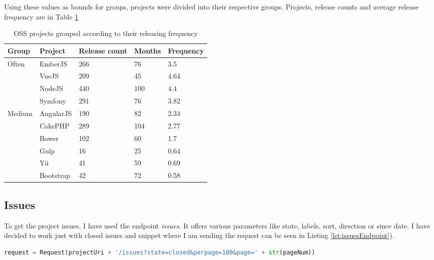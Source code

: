 Using these values as bounds for groups, projects were divided into their respective groups. Projects, release counts and average release frequency are in Table \ref{table:releaseGroupsCalculation}

\begin{table}[H]
\centering
\begin{tabular}{| p{2cm}|p{2cm}|p{2.8cm}|p{1.8cm}|p{2cm}|}
 \hline
\textbf{Group} & \textbf{ Project }& \textbf{Release count} & \textbf{ Months }& \textbf{Frequency}\\
 \hline
  \multirow{4}{*}{Often}   & EmberJS & 266   & 76 & 3.5\\ 
    & VueJS &  209 & 45 & 4.64 \\ 
    & NodeJS & 440 & 100 & 4.4\\  
    & Symfony & 291 & 76 & 3.82\\ \hline 
  \multirow{4}{*}{Medium}   & AngularJS & 190   & 82 & 2.34\\ 
    & CakePHP & 289 & 104 & 2.77\\ 
    & Bower &  102 & 60 & 1.7\\   \hline 
  \multirow{4}{*}{Seldom}   & Gulp & 16 & 25 & 0.64\\ 
    & Yii & 41 & 59 & 0.69\\ 
    & Bootstrap &  42 & 72 & 0.58\\  \hline 
\end{tabular}
\caption{OSS projects grouped according to their releasing frequency}
\label{table:releaseGroupsCalculation}
\end{table}


\subsection{Issues} \label{ssec:issuesMining}
To get the project issues, I have used the endpoint \textit{issues}. It offers various parameters like state, labels, sort, direction or since date. I have decided to work just with closed issues and snippet where I am sending the request can be seen in Listing \ref{lst:issuesEndpoint}).

\begin{lstlisting}[caption={Requesting 100 closed issues},label={lst:issuesEndpoint},language=Python]
request = Request(projectUri + '/issues?state=closed&perpage=100&page=' + str(pageNum))
\end{lstlisting}

